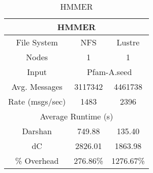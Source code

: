 \begin{table}[h]
\begin{subtable}[h]{0.5\textwidth}
    \end{subtable}
    \begin{subtable}[h]{0.5\textwidth}
        \centering
        \setlength\tabcolsep{18.5pt}
        \begin{tabular}{|cclcl|}
        \hline
        \multicolumn{5}{|c|}{HMMER}                                                                            \\ \hline
        \multicolumn{1}{|c|}{File System}     & \multicolumn{2}{c|}{NFS}      & \multicolumn{2}{c|}{Lustre}    \\ \hline
        \multicolumn{1}{|c|}{Nodes}           & \multicolumn{2}{c|}{1}        & \multicolumn{2}{c|}{1}         \\ \hline
        \multicolumn{1}{|c|}{Input}           & \multicolumn{4}{c|}{Pfam-A.seed}                               \\ \hline
        \multicolumn{1}{|c|}{Avg. Messages}   & \multicolumn{2}{c|}{3117342}  & \multicolumn{2}{c|}{4461738}   \\ \hline
        \multicolumn{1}{|c|}{Rate (msgs/sec)} & \multicolumn{2}{c|}{1483}     & \multicolumn{2}{c|}{2396}      \\ \hline
        \multicolumn{5}{|c|}{Average Runtime (s)}                                                              \\ \hline
        \multicolumn{1}{|c|}{Darshan}         & \multicolumn{2}{c|}{749.88}   & \multicolumn{2}{c|}{135.40}    \\ \hline
        \multicolumn{1}{|c|}{dC}              & \multicolumn{2}{c|}{2826.01}  & \multicolumn{2}{c|}{1863.98}   \\ \hline
        \multicolumn{1}{|c|}{\% Overhead}     & \multicolumn{2}{c|}{276.86\%} & \multicolumn{2}{c|}{1276.67\%} \\ \hline
        \end{tabular}
    \caption{HMMER} 
    \label{subtable:HMMER}
\end{subtable}

\end{table}
